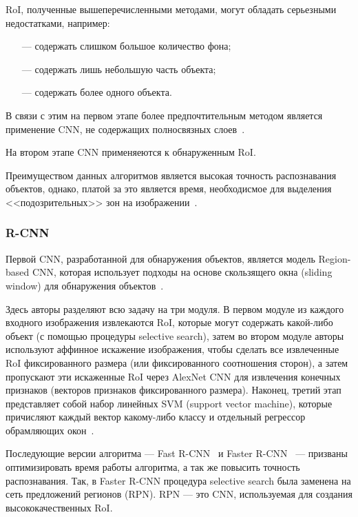 RoI, полученные вышеперечисленными методами, могут обладать серьезными недостатками, например:
\begin{itemize}
    \item[---] содержать слишком большое количество фона;
    \item[---] содержать лишь небольшую часть объекта;
    \item[---] содержать более одного объекта.
\end{itemize}

В связи с этим на первом этапе более предпочтительным методом является применение CNN, не содержащих полносвязных слоев~\cite{realtime-recognition-algorythm}.

На втором этапе CNN применяеются к обнаруженным RoI.

Преимуществом данных алгоритмов является высокая точность распознавания объектов, однако, платой за это является время, необходисмое для выделения <<подозрительных>> зон на изображении~\cite{overview-of-two-stage-object-detection}.

\subsubsection*{R-CNN}

Первой CNN, разработанной для обнаружения объектов, является модель Region-based CNN, которая использует подходы на основе скользящего окна (sliding window) для обнаружения объектов~\cite{r-cnn}.

Здесь авторы разделяют всю задачу на три модуля. В первом модуле из каждого входного изображения извлекаются RoI, которые могут содержать какой-либо объект (с помощью процедуры selective search), затем во втором модуле авторы используют аффинное искажение изображения, чтобы сделать все извлеченные RoI фиксированного размера (или фиксированного соотношения сторон), а затем пропускают эти искаженные RoI через AlexNet CNN для извлечения конечных признаков (векторов признаков фиксированного размера). Наконец, третий этап представляет собой набор линейных SVM (support vector machine), которые причисляют каждый вектор какому-либо классу и отдельный регрессор обрамляющих окон~\cite{r-cnn}.

Последующие версии алгоритма --- Fast R-CNN~\cite{fast-r-cnn} и Faster R-CNN~\cite{faster-r-cnn} --- призваны оптимизировать время работы алгоритма, а так же повысить точность распознавания. Так, в Faster R-CNN процедура selective search была заменена на сеть предложений регионов (RPN). RPN --- это CNN, используемая для создания высококачественных RoI.

